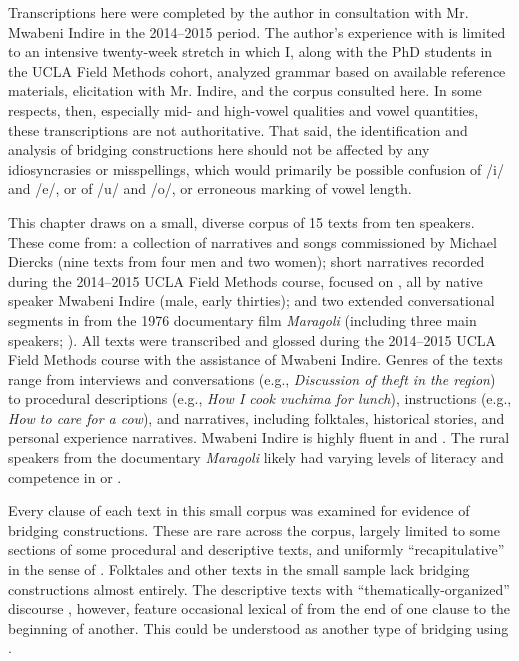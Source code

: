 \documentclass[output=paper]{LSP/langsci}
\begin{document}
Transcriptions here were completed by the author in consultation with Mr. Mwabeni Indire in the 2014--2015 period. The author’s experience with  is limited to an intensive twenty-week stretch in which I, along with the PhD students in the UCLA Field Methods cohort, analyzed  grammar based on available reference materials, elicitation with Mr. Indire, and the corpus consulted here. In some respects, then, especially mid- and high-vowel qualities and vowel quantities, these transcriptions are not authoritative. That said, the identification and analysis of bridging constructions here should not be affected by any idiosyncrasies or misspellings, which would primarily be possible confusion of /i/ and /e/, or of /u/ and /o/, or erroneous marking of vowel length. 

This chapter draws on a small, diverse corpus of 15  texts from ten speakers. These come from: a collection of  narratives and songs commissioned by Michael Diercks (nine texts from four men and two women); short narratives recorded during the 2014--2015 UCLA Field Methods course, focused on , all by native speaker Mwabeni Indire (male, early thirties); and two extended conversational segments in  from the 1976 documentary film \textit{Maragoli} (including three main  speakers; \citealt{Nichols1976}). All texts were transcribed and glossed during the 2014--2015 UCLA Field Methods course with the assistance of Mwabeni Indire. Genres of the texts range from interviews and conversations (e.g., \textit{Discussion of theft in the region}) to procedural descriptions (e.g., \textit{How I cook \emph{vuchima} for lunch}), instructions (e.g., \textit{How to care for a cow}), and narratives, including folktales, historical stories, and personal experience narratives. Mwabeni Indire is highly fluent in  and . The rural  speakers from the documentary \textit{Maragoli} likely had varying levels of literacy and competence in  or .

Every clause of each text in this small corpus was examined for evidence of bridging constructions. These are rare across the corpus, largely limited to some sections of some procedural and descriptive texts, and uniformly ``recapitulative'' in the sense of . Folktales and other  texts in the small sample lack bridging constructions almost entirely. The descriptive texts with ``thematically-organized'' discourse \citep{farr99}, however, feature occasional lexical  of  from the end of one clause to the beginning of another. This could be understood as another type of bridging using .
\end{document}
